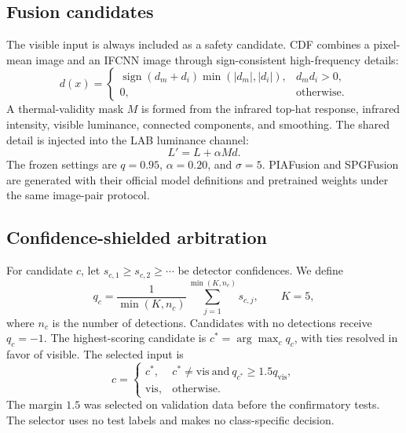 \documentclass[preprint,11pt]{elsarticle}
\begin{document}
\subsection{Fusion candidates}

The visible input is always included as a safety candidate. CDF combines a
pixel-mean image and an IFCNN image through sign-consistent high-frequency
details:
\begin{equation}
d(x)=
\begin{cases}
\operatorname{sign}(d_m+d_i)\min(|d_m|,|d_i|), & d_m d_i>0,\\
0, & \text{otherwise}.
\end{cases}
\end{equation}
A thermal-validity mask \(M\) is formed from the infrared top-hat response,
infrared intensity, visible luminance, connected components, and smoothing.
The shared detail is injected into the LAB luminance channel:
\begin{equation}
L' = L + \alpha M d.
\end{equation}
The frozen settings are \(q=0.95\), \(\alpha=0.20\), and \(\sigma=5\).
PIAFusion and SPGFusion are generated with their official model definitions and
pretrained weights under the same image-pair protocol.
\cite{zhang2020,tang2022,zhang2026}

\subsection{Confidence-shielded arbitration}

For candidate \(c\), let
\(s_{c,1}\ge s_{c,2}\ge\cdots\) be detector confidences. We define
\begin{equation}
q_c=\frac{1}{\min(K,n_c)}
\sum_{j=1}^{\min(K,n_c)}s_{c,j},
\qquad K=5,
\end{equation}
where \(n_c\) is the number of detections. Candidates with no detections receive
\(q_c=-1\). The highest-scoring candidate is
\(c^\ast=\arg\max_c q_c\), with ties resolved in favor of visible. The selected
input is
\begin{equation}
c=
\begin{cases}
c^\ast, & c^\ast\ne\mathrm{vis}\ \text{and}\ q_{c^\ast}\ge1.5q_{\mathrm{vis}},\\
\mathrm{vis}, & \text{otherwise}.
\end{cases}
\end{equation}
The margin \(1.5\) was selected on validation data before the confirmatory
tests. The selector uses no test labels and makes no class-specific decision.
\end{document}
